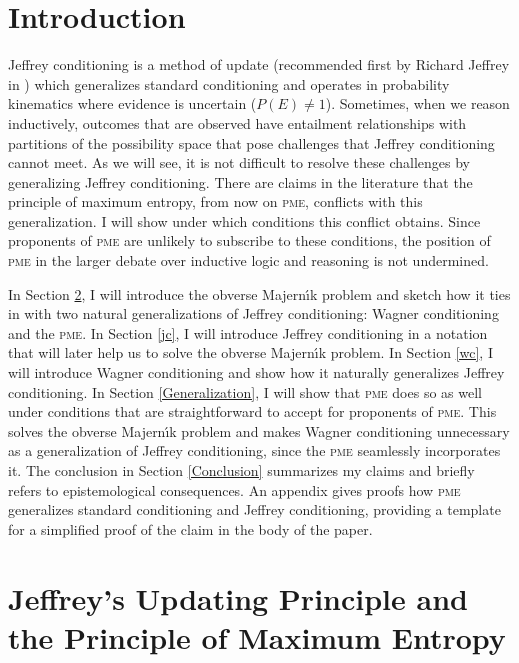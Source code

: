 \section{Introduction}
\label{mintroduction}

Jeffrey conditioning is a method of update (recommended first by
Richard Jeffrey in ) which generalizes standard
conditioning and operates in probability kinematics where evidence is
uncertain ($P(E)\neq{}1$). Sometimes, when we reason inductively,
outcomes that are observed have entailment relationships with
partitions of the possibility space that pose challenges that Jeffrey
conditioning cannot meet. As we will see, it is not difficult to
resolve these challenges by generalizing Jeffrey conditioning. There
are claims in the literature that the principle of maximum entropy,
from now on \textsc{pme}, conflicts with this generalization. I will
show under which conditions this conflict obtains. Since proponents of
\textsc{pme} are unlikely to subscribe to these conditions, the
position of \textsc{pme} in the larger debate over inductive logic and
reasoning is not undermined.

In Section \ref{juppme}, I will introduce the obverse Majern{\'\i}k
problem and sketch how it ties in with two natural generalizations of
Jeffrey conditioning: Wagner conditioning and the \textsc{pme}. In
Section \ref{jc}, I will introduce Jeffrey conditioning in a notation
that will later help us to solve the obverse Majern{\'\i}k problem. In
Section \ref{wc}, I will introduce Wagner conditioning and show how it
naturally generalizes Jeffrey conditioning. In Section
\ref{Generalization}, I will show that \textsc{pme} does so as well
under conditions that are straightforward to accept for proponents of
\textsc{pme}. This solves the obverse Majern{\'\i}k problem and makes
Wagner conditioning unnecessary as a generalization of Jeffrey
conditioning, since the \textsc{pme} seamlessly incorporates it. The
conclusion in Section \ref{Conclusion} summarizes my claims and
briefly refers to epistemological consequences. An appendix gives
proofs how \textsc{pme} generalizes standard conditioning and Jeffrey
conditioning, providing a template for a simplified proof of the claim
in the body of the paper.

\section{Jeffrey's Updating Principle and the Principle of Maximum Entropy}
\label{juppme}

